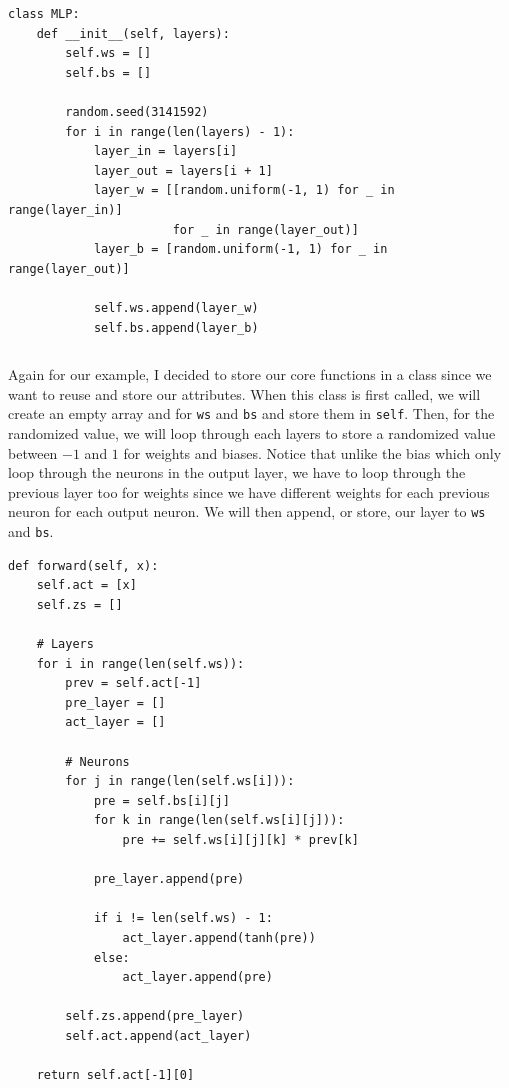 \documentclass[../../main.tex]{subfiles}
\begin{document}
\begin{jupyter}
\begin{lstlisting}[style=jin]
class MLP:
    def __init__(self, layers):
        self.ws = []
        self.bs = []

        random.seed(3141592)
        for i in range(len(layers) - 1):
            layer_in = layers[i]
            layer_out = layers[i + 1]
            layer_w = [[random.uniform(-1, 1) for _ in range(layer_in)]
                       for _ in range(layer_out)]
            layer_b = [random.uniform(-1, 1) for _ in range(layer_out)]

            self.ws.append(layer_w)
            self.bs.append(layer_b)
\end{lstlisting}
\begin{lstlisting}[style=jout]
\end{lstlisting}
\end{jupyter}

Again for our example, I decided to store our core functions in
a class since we want to reuse and store our attributes.
When this class is first called, we will create an empty array
and for \verb|ws| and \verb|bs| and store them in \verb|self|. Then,
for the randomized value, we will loop through each layers to store
a randomized value between $-1$ and $1$ for weights and biases.
Notice that unlike the bias which only loop through the neurons
in the output layer, we have to loop through the previous layer
too for weights since we have different weights for each previous
neuron for each output neuron. We will then append, or store, our
layer to \verb|ws| and \verb|bs|.

\begin{jupyter}
\begin{lstlisting}[style=jin]
def forward(self, x):
    self.act = [x]
    self.zs = []
    
    # Layers
    for i in range(len(self.ws)):
        prev = self.act[-1]
        pre_layer = []
        act_layer = []

        # Neurons
        for j in range(len(self.ws[i])):
            pre = self.bs[i][j]
            for k in range(len(self.ws[i][j])):
                pre += self.ws[i][j][k] * prev[k]
            
            pre_layer.append(pre)

            if i != len(self.ws) - 1:
                act_layer.append(tanh(pre))
            else:
                act_layer.append(pre)
                
        self.zs.append(pre_layer)
        self.act.append(act_layer)
        
    return self.act[-1][0]
\end{lstlisting}
\begin{lstlisting}[style=jout]
\end{lstlisting}
\end{jupyter}
\end{document}
